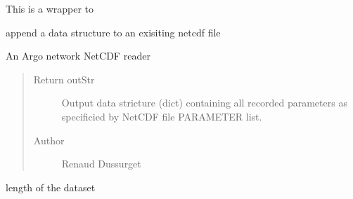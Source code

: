 \documentclass[letterpaper,10pt,english]{sphinxmanual}
\begin{document}
\begin{fulllineitems}
\begin{fulllineitems}
\end{fulllineitems}


\begin{fulllineitems}
\label{altimetry.data:altimetry.data.hydro_data.pop}
This is a wrapper to {\hyperref[altimetry.data:altimetry.data.hydro_data.delete_Variable]{}}

\end{fulllineitems}


\begin{fulllineitems}
\label{altimetry.data:altimetry.data.hydro_data.push_nc}
append a data structure to an exisiting netcdf file

\end{fulllineitems}


\begin{fulllineitems}
\label{altimetry.data:altimetry.data.hydro_data.read_ArgoNC}
An Argo network NetCDF reader
\begin{quote}\begin{description}
\item[{Return outStr}] \leavevmode
Output data stricture (dict) containing all recorded parameters as specificied by NetCDF file PARAMETER list.

\item[{Author }] \leavevmode
Renaud Dussurget

\end{description}\end{quote}

\end{fulllineitems}


\begin{fulllineitems}
\label{altimetry.data:altimetry.data.hydro_data.size}
length of the dataset


\end{fulllineitems}
\end{fulllineitems}
\end{document}
